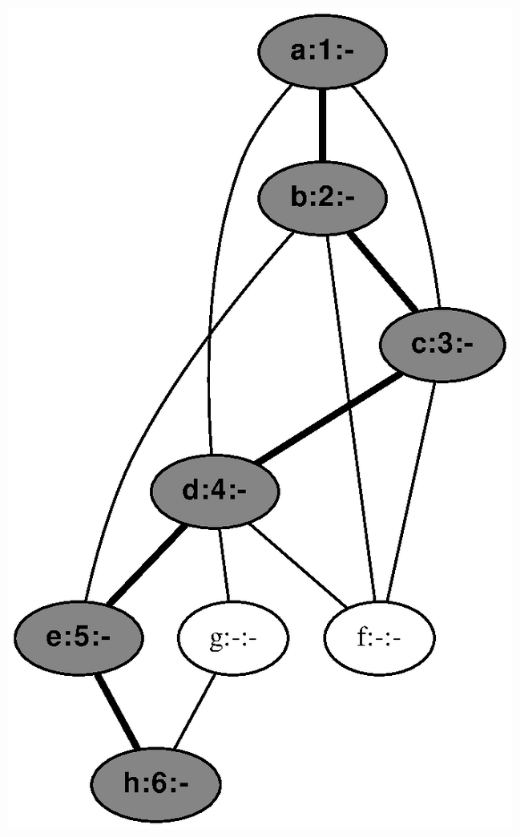 \documentclass{article}
\begin{document}
\includegraphics[height=.3\textheight]{dfs_undirected_classroom_06.eps}
\vspace{1em}
\end{document}

